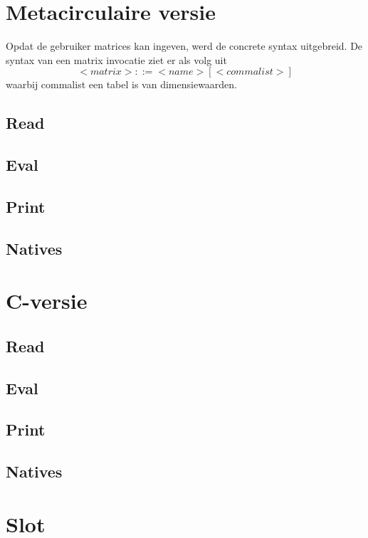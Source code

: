 \documentclass[a4paper,10pt,titlepage]{article}
\begin{document}
\section{Metacirculaire versie}

Opdat de gebruiker matrices kan ingeven, werd de concrete syntax uitgebreid. De syntax van een matrix invocatie ziet er als volg uit $$<matrix> ::= <name> [ <commalist> ]$$ waarbij commalist een tabel is van dimensiewaarden. 

\subsection{Read}

\subsection{Eval}

\subsection{Print}

\subsection{Natives}

\section{C-versie}

\subsection{Read}

\subsection{Eval}

\subsection{Print}

\subsection{Natives}

\section{Slot}
\end{document}

